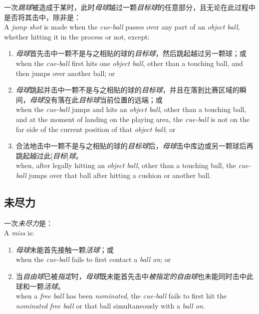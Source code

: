 \noindent 一次\textit{跳球}被造成于某时，此时\textit{母球}越过一颗\textit{目标球}的任意部分，且无论在此过程中是否将其击中，除非是：\\
A \textit{jump shot} is made when the \textit{cue-ball} passes over any part of an \textit{object ball}, whether hitting it in the process or not, except:
\begin{enumerate}[label=(\alph*)]
    \item \textit{母球}首先击中一颗不是与之相贴的球的\textit{目标球}，然后跳起越过另一颗球；或\\
    when the \textit{cue-ball} first hits one \textit{object ball}, other than a touching ball, and then jumps over another ball; or
    \item \textit{母球}跳起并击中一颗不是与之相贴的球的\textit{目标球}，并且在落到比赛区域的瞬间，\textit{母球}没有落在此\textit{目标球}当前位置的远端；或\\
    when the \textit{cue-ball} jumps and hits an \textit{object ball}, other than a touching ball, and at the moment of landing on the playing area, the \textit{cue-ball} is not on the far side of the current position of that \textit{object ball}; or
    \item 合法地击中一颗不是与之相贴的球的\textit{目标球}后，\textit{母球}击中库边或另一颗球后再跳起越过此[\textit{目标}]\textit{球}。\\
    when, after legally hitting an \textit{object ball}, other than a touching ball, the \textit{cue-ball} jumps over that ball after hitting a cushion or another ball.
\end{enumerate}

\subsection{未尽力}

\noindent 一次\textit{未尽力}是：\\
A \textit{miss} is:
\begin{enumerate}[label=(\alph*)]
    \item \textit{母球}未能首先接触一颗\textit{活球}；或\\
    when the \textit{cue-ball} fails to first contact a \textit{ball on}; or
    \item 当\textit{自由球}已被\textit{指定}时，\textit{母球}既未能首先击中\textit{被指定的}\textit{自由球}也未能同时击中此球和一颗\textit{活球}。\\
    when a \textit{free ball} has been \textit{nominated}, the \textit{cue-ball} fails to first hit the \textit{nominated} \textit{free ball} or that ball simultaneously with a \textit{ball on}.
\end{enumerate}

